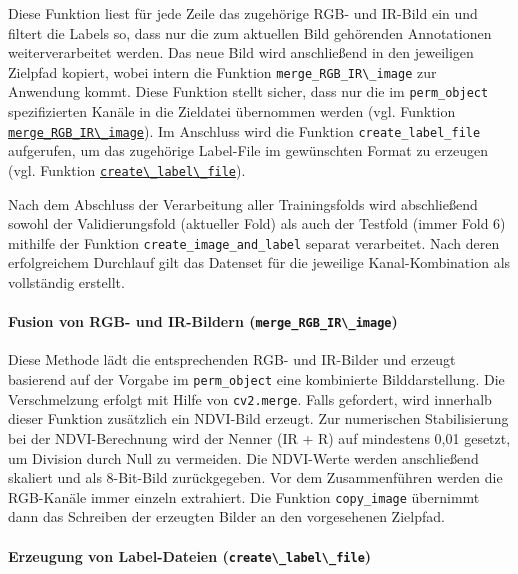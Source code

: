 Diese Funktion liest für jede Zeile das zugehörige \acrshort{RGB}- und \acrshort{IR}-Bild ein und filtert die Labels so, dass nur die zum aktuellen Bild gehörenden Annotationen weiterverarbeitet werden. Das neue Bild wird anschließend in den jeweiligen Zielpfad kopiert, wobei intern die Funktion \lstinline|merge_RGB_IR\_image| zur Anwendung kommt. Diese Funktion stellt sicher, dass nur die im \lstinline|perm_object| spezifizierten Kanäle in die Zieldatei übernommen werden (vgl. Funktion \hyperlink{par:merge_RGB_IR}{\lstinline|merge_RGB_IR\_image|}). Im Anschluss wird die Funktion \lstinline|create_label_file| aufgerufen, um das zugehörige Label-File im gewünschten Format zu erzeugen (vgl. Funktion \hyperlink{par:create_label_file}{\lstinline|create\_label\_file|}).

Nach dem Abschluss der Verarbeitung aller Trainingsfolds wird abschließend sowohl der Validierungsfold (aktueller Fold) als auch der Testfold (immer Fold 6) mithilfe der Funktion \lstinline|create_image_and_label| separat verarbeitet. Nach deren erfolgreichem Durchlauf gilt das Datenset für die jeweilige Kanal-Kombination als vollständig erstellt.

\paragraph{Fusion von RGB- und IR-Bildern (\lstinline|merge_RGB_IR\_image|)}
\hypertarget{par:merge_RGB_IR}{}

Diese Methode lädt die entsprechenden \acrshort{RGB}- und \acrshort{IR}-Bilder und erzeugt basierend auf der Vorgabe im \lstinline|perm_object| eine kombinierte Bilddarstellung. Die Verschmelzung erfolgt mit Hilfe von \lstinline|cv2.merge|. Falls gefordert, wird innerhalb dieser Funktion zusätzlich ein \acrshort{NDVI}-Bild erzeugt. Zur numerischen Stabilisierung bei der \acrshort{NDVI}-Berechnung wird der Nenner (\acrshort{IR} + \acrshort{R}) auf mindestens 0{,}01 gesetzt, um Division durch Null zu vermeiden. Die \acrshort{NDVI}-Werte werden anschließend skaliert und als 8-Bit-Bild zurückgegeben. Vor dem Zusammenführen werden die \acrshort{RGB}-Kanäle immer einzeln extrahiert. Die Funktion \lstinline|copy_image| übernimmt dann das Schreiben der erzeugten Bilder an den vorgesehenen Zielpfad.

\paragraph{Erzeugung von Label-Dateien (\lstinline|create\_label\_file|)}
\hypertarget{par:create_label_file}{}


